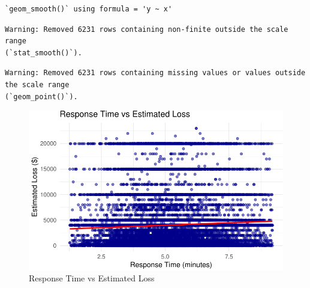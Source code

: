 \documentclass[
  letterpaper,
  DIV=11,
  numbers=noendperiod]{scrartcl}
\newenvironment{Shaded}{\begin{snugshade}}{\end{snugshade}}
\newcommand{\AttributeTok}[1]{\textcolor[rgb]{0.40,0.45,0.13}{#1}}
\newcommand{\ConstantTok}[1]{\textcolor[rgb]{0.56,0.35,0.01}{#1}}
\newcommand{\FloatTok}[1]{\textcolor[rgb]{0.68,0.00,0.00}{#1}}
\newcommand{\FunctionTok}[1]{\textcolor[rgb]{0.28,0.35,0.67}{#1}}
\newcommand{\NormalTok}[1]{\textcolor[rgb]{0.00,0.23,0.31}{#1}}
\newcommand{\SpecialCharTok}[1]{\textcolor[rgb]{0.37,0.37,0.37}{#1}}
\newcommand{\StringTok}[1]{\textcolor[rgb]{0.13,0.47,0.30}{#1}}
\begin{document}
\begin{Shaded}
\end{Shaded}

\begin{verbatim}
`geom_smooth()` using formula = 'y ~ x'
\end{verbatim}

\begin{verbatim}
Warning: Removed 6231 rows containing non-finite outside the scale range
(`stat_smooth()`).
\end{verbatim}

\begin{verbatim}
Warning: Removed 6231 rows containing missing values or values outside the scale range
(`geom_point()`).
\end{verbatim}

\begin{figure}[H]

{\centering \includegraphics{paper_files/figure-pdf/fig-response-estimated-loss-1.pdf}

}

\caption{\label{fig-response-estimated-loss}Response Time vs Estimated
Loss}

\end{figure}
\end{document}
